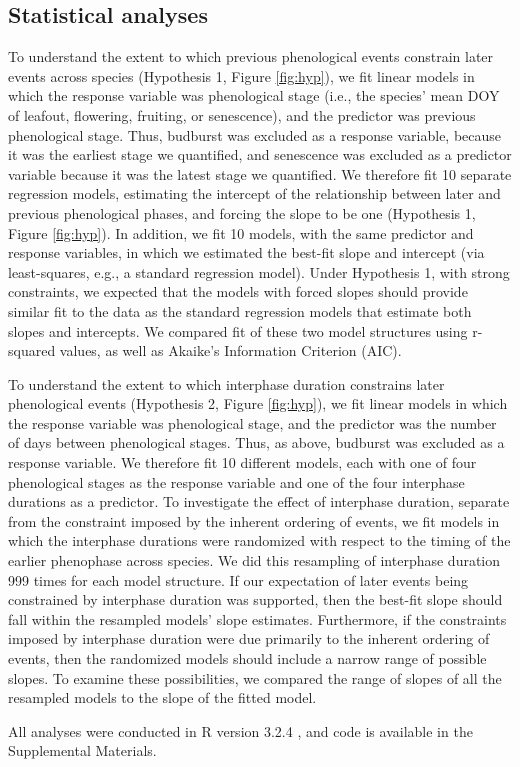 \documentclass{article}
\begin{document}
\subsection*{Statistical analyses}
To understand the extent to which previous phenological events constrain later events across species (Hypothesis 1, Figure \ref{fig:hyp}), we fit linear models in which the response variable was phenological stage (i.e., the species' mean DOY of leafout, flowering, fruiting, or senescence), and the predictor was previous phenological stage. Thus, budburst was excluded as a response variable, because it was the earliest stage we quantified, and senescence was excluded as a predictor variable because it was the latest stage we quantified. We therefore fit 10 separate regression models, estimating the intercept of the relationship between later and previous phenological phases, and forcing the slope to be one (Hypothesis 1, Figure \ref{fig:hyp}). In addition, we fit 10 models, with the same predictor and response variables, in which we estimated the best-fit slope and intercept (via least-squares, e.g., a standard regression model). Under Hypothesis 1, with strong constraints, we expected that the models with forced slopes should provide similar fit to the data as the standard regression models that estimate both slopes and intercepts. We compared fit of these two model structures using r-squared values, as well as Akaike's Information Criterion (AIC). 
\par To understand the extent to which interphase duration constrains later phenological events (Hypothesis 2, Figure \ref{fig:hyp}), we fit linear models in which the response variable was phenological stage, and the predictor was the number of days between phenological stages. Thus, as above, budburst was excluded as a response variable. We therefore fit 10 different models, each with one of four phenological stages as the response variable and one of the four interphase durations as a predictor. To investigate the effect of interphase duration, separate from the constraint imposed by the inherent ordering of events, we fit models in which the interphase durations were randomized with respect to the timing of the earlier phenophase across species. We did this resampling of interphase duration 999 times for each model structure. If our expectation of later events being constrained by interphase duration was supported, then the best-fit slope should fall within the resampled models' slope estimates. Furthermore, if the constraints imposed by interphase duration were due primarily to the inherent ordering of events, then the randomized models should include a narrow range of possible slopes. To examine these possibilities, we compared the range of slopes of all the resampled models to the slope of the fitted model. 
\par All analyses were conducted in R version 3.2.4 \citep{rcoreteam2017}, and code is available in the Supplemental Materials.
\end{document}

